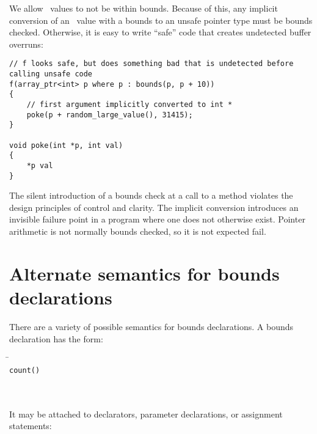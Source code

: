 We allow \arrayptr\ values to not be within bounds. Because of
this, any implicit conversion of an \arrayptr\ value with a
bounds to an unsafe pointer type must be bounds checked. Otherwise, it
is easy to write ``safe'' code that creates undetected buffer overruns:

\begin{verbatim}
// f looks safe, but does something bad that is undetected before calling unsafe code
f(array_ptr<int> p where p : bounds(p, p + 10))
{
    // first argument implicitly converted to int *
    poke(p + random_large_value(), 31415);  
}

void poke(int *p, int val)
{
    *p val
}
\end{verbatim}

The silent introduction of a bounds check at a call to a method violates
the design principles of control and clarity. The implicit conversion
introduces an invisible failure point in a program where one does not
otherwise exist. Pointer arithmetic is not normally bounds checked, so
it is not expected fail.

\section{Alternate semantics for bounds declarations}
\label{section:bounds-declarations-alternate-semantics}

There are a variety of possible semantics for
bounds declarations. A bounds declaration has the form:

\begin{quote}
\end{quote}

\begin{tabbing}
\= \\
\> \texttt{count(}\texttt{)} \\
\>  \\
\> \boundsnone \\
\> \boundsany
\end{tabbing}

It may be attached to declarators, parameter declarations, or assignment statements:

